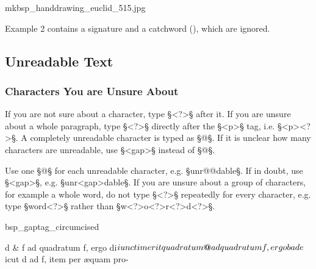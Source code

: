 \begin{sampleImage}{mkbsp_handdrawing_euclid_515.jpg}

\end{sampleImage}

\begin{crossref}
Example 2 contains a signature and a catchword (), which are ignored.
\end{crossref}


\tocspace
\subsection{Unreadable Text}
\label{section unreadable text}

\subsubsection{Characters You are Unsure About}
\label{section characters you are unsure about}

\begin{mainrule}
If you are not sure about a character, type §<?>§ after it. If you are unsure about a whole paragraph, type §<?>§ directly after the §<p>§ tag, i.e. §<p><?>§. A completely unreadable character is typed as §@§. If it is unclear how many characters are unreadable, use §<gap>§ instead of §@§.
\end{mainrule}

\begin{clarification}
Use one §@§ for each unreadable character, e.g. §unr@@dable§. If in doubt, use §<gap>§, e.g. §unr<gap>dable§. If you are unsure about a group of characters, for example a whole word, do not type §<?>§ repeatedly for every character, e.g. type §word<?>§ rather than §w<?>o<?>r<?>d<?>§.
\end{clarification}

\vspace{2mm}
\begin{sampleImage}[ 1: \, a stain]{bsp_gaptag_circumcised} 
\begin{typeLatin}
 \someText
d & f ad quadratum f, ergo di$iunctim erit quadratum  ad\\
quadratum f, ergo b ad e $icut d ad f, item per æquam pro-\\ 
\someText {}
\end{typeLatin}

\end{sampleImage}


